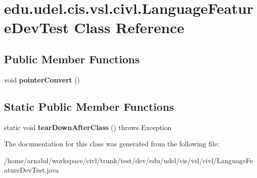 \hypertarget{classedu_1_1udel_1_1cis_1_1vsl_1_1civl_1_1LanguageFeatureDevTest}{}\section{edu.\+udel.\+cis.\+vsl.\+civl.\+Language\+Feature\+Dev\+Test Class Reference}
\label{classedu_1_1udel_1_1cis_1_1vsl_1_1civl_1_1LanguageFeatureDevTest}
\subsection*{Public Member Functions}
\begin{DoxyCompactItemize}
\item 
\hypertarget{classedu_1_1udel_1_1cis_1_1vsl_1_1civl_1_1LanguageFeatureDevTest_a58016d28e315bbcec446b96fa78b64dd}{}void {\bfseries pointer\+Convert} ()\label{classedu_1_1udel_1_1cis_1_1vsl_1_1civl_1_1LanguageFeatureDevTest_a58016d28e315bbcec446b96fa78b64dd}

\end{DoxyCompactItemize}
\subsection*{Static Public Member Functions}
\begin{DoxyCompactItemize}
\item 
\hypertarget{classedu_1_1udel_1_1cis_1_1vsl_1_1civl_1_1LanguageFeatureDevTest_a36f99999023d3c3000add3ed3d105d00}{}static void {\bfseries tear\+Down\+After\+Class} ()  throws Exception \label{classedu_1_1udel_1_1cis_1_1vsl_1_1civl_1_1LanguageFeatureDevTest_a36f99999023d3c3000add3ed3d105d00}

\end{DoxyCompactItemize}


The documentation for this class was generated from the following file\+:\begin{DoxyCompactItemize}
\item 
/home/arnabd/workspace/civl/trunk/test/dev/edu/udel/cis/vsl/civl/Language\+Feature\+Dev\+Test.\+java\end{DoxyCompactItemize}
